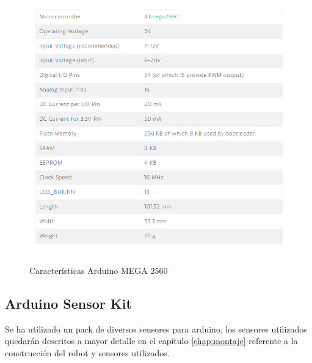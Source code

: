 \begin{figure}[H]
  \begin{center}
    \includegraphics[scale=0.5]{imagenes/arduino_caracteristicas.png}\\
    \caption{Características Arduino MEGA 2560}
  \end{center}
\end{figure}


\subsection {Arduino Sensor Kit}

Se ha utilizado un pack de diversos sensores para arduino, los sensores utilizados quedarán descritos a mayor detalle en el capítulo \ref{chap:montaje} referente a la construcción del robot y sensores utilizados.\\

